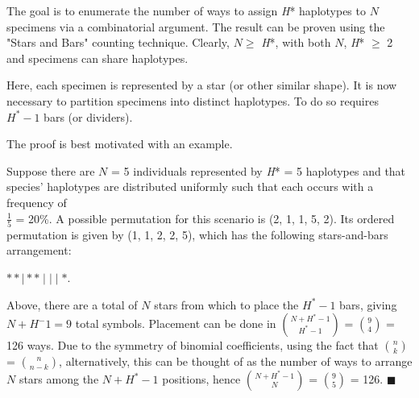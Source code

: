 The goal is to enumerate the number of ways to assign \textit{H}* haplotypes to $N$ specimens via a combinatorial argument. The result can be proven using the "Stars and Bars" counting technique. Clearly, $N \geq$ \textit{H}*, with both $N$, \textit{H}* $\geq$ 2 and specimens can share haplotypes. 

Here, each specimen is represented by a star (or other similar shape). It is now necessary to partition specimens into distinct haplotypes. To do so requires $H^* - 1$ bars (or dividers). 

The proof is best motivated with an example.

Suppose there are $N$ = 5 individuals represented by \textit{H}* = 5 haplotypes and that species' haplotypes are distributed uniformly such that each occurs with a frequency of \\ $\frac{1}{5}$ = 20\%. A possible permutation for this scenario is (2, 1, 1, 5, 2). Its ordered permutation is given by (1, 1, 2, 2, 5), which has the following stars-and-bars arrangement:

\begin{center}
$* * \mid * * \mid \mid \mid *$.
\end{center}

\noindent Above, there are a total of $N$ stars from which to place the $H^* - 1$ bars, giving $N + H^ - 1 = 9$ total symbols. Placement can be done in ${N + H^* - 1}\choose{H^* - 1}$ = ${9}\choose{4}$ = 126 ways. Due to the symmetry of binomial coefficients, using the fact that ${n}\choose{k}$ = ${n}\choose{n-k}$, alternatively, this can be thought of as the number of ways to arrange $N$ stars among the $N + H^* - 1$ positions, hence ${N + H^* - 1}\choose{N}$ = ${9}\choose{5}$ = 126. $\blacksquare$ 


